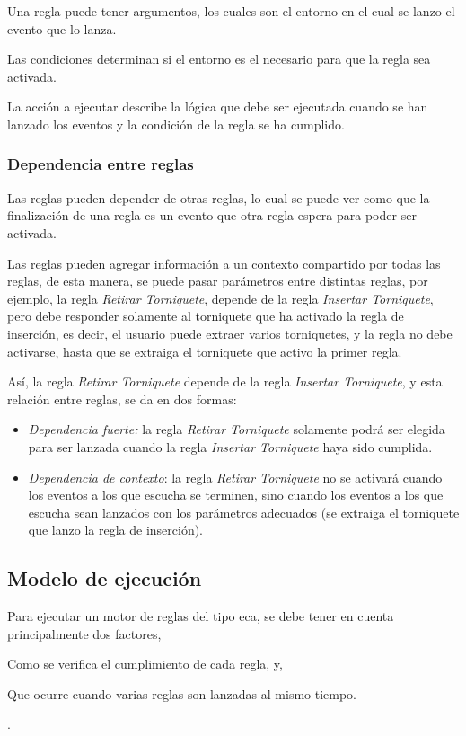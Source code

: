 Una regla  puede tener argumentos, los cuales son el entorno en el cual se lanzo
el evento que lo lanza.

Las condiciones determinan si el entorno es el necesario para que la regla sea
activada.

La acción a ejecutar describe la lógica que debe ser ejecutada cuando se han
lanzado los eventos y la condición de la regla se ha cumplido.

\subsubsection{Dependencia entre reglas}

Las reglas pueden depender de otras reglas, lo cual se puede ver como que la
finalización de una regla es un evento que otra regla espera para poder ser
activada.

Las reglas pueden agregar información a un contexto compartido por todas las
reglas, de esta manera, se puede pasar parámetros entre distintas reglas, por
ejemplo, la regla \emph{Retirar Torniquete}, depende de la regla \emph{Insertar Torniquete}, pero debe responder solamente al torniquete
que ha activado la regla de inserción, es decir, el usuario puede extraer varios
torniquetes, y la regla no debe activarse, hasta que se extraiga el torniquete
que activo la primer regla.

Así, la regla \emph{Retirar Torniquete} depende de la regla \emph{Insertar
Torniquete}, y esta relación entre reglas, se da en dos formas:

\begin{itemize}
\item  \emph{Dependencia fuerte:} la regla \emph{Retirar Torniquete} solamente podrá
	ser elegida para ser lanzada cuando la regla \emph{Insertar Torniquete}
	haya sido cumplida.
\item  \emph{Dependencia de contexto}: la regla \emph{Retirar Torniquete} no se
	activará cuando los eventos a los que escucha se terminen, sino cuando
	los eventos a los que escucha sean lanzados con los parámetros adecuados
	(se extraiga el torniquete que lanzo la regla de inserción).
\end{itemize}




\subsection{Modelo de ejecución}

Para ejecutar un motor de reglas del tipo \gls{eca}, se debe tener en cuenta
principalmente dos factores, 
\begin{enumerate*}[label=\itshape\alph*\upshape)]
\item  Como se verifica el cumplimiento de cada regla, y, 
\item  Que ocurre cuando varias reglas son lanzadas al mismo tiempo.
\end{enumerate*}.

